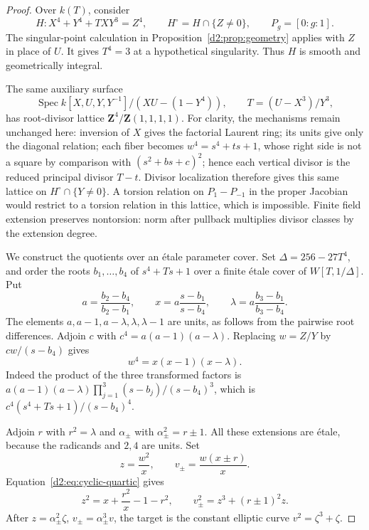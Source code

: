 \documentclass[11pt,a4paper]{amsart}
\numberwithin{equation}{section}
\theoremstyle{definition}
\theoremstyle{remark}
\newcommand{\DtwoZZ}{\mathbf{Z}}
\newcommand{\DtwoSpec}{\operatorname{Spec}}
\begin{document}
\begin{proof}
Over \(k(T)\), consider
\[
 H\colon X^4+Y^4+TXY^3=Z^4,\qquad
 H^\circ=H\cap\{Z\ne0\},\qquad
 P_g=[0:g:1].
\]
The singular-point calculation in
Proposition~\ref{d2:prop:geometry} applies with \(Z\) in place of \(U\).
It gives \(T^4=3\) at a hypothetical singularity.
Thus \(H\) is smooth and geometrically integral.

The same auxiliary surface
\[
 \DtwoSpec k[X,U,Y,Y^{-1}]/(XU-(1-Y^4)),
 \qquad T=(U-X^3)/Y^3,
\]
has root-divisor lattice \(\DtwoZZ^4/\DtwoZZ(1,1,1,1)\).
For clarity, the mechanisms remain unchanged here: inversion of \(X\)
gives the factorial Laurent ring; its units give only the diagonal
relation; each fiber becomes
\(w^4=s^4+ts+1\), whose right side is not a square by comparison
with \((s^2+bs+c)^2\); hence each vertical divisor is the reduced
principal divisor \(T-t\).
Divisor localization therefore gives this same lattice on
\(H^\circ\cap\{Y\ne0\}\).
A torsion relation on \(P_1-P_{-1}\) in the proper Jacobian would
restrict to a torsion relation in this lattice, which is impossible.
Finite field extension preserves nontorsion: norm after pullback multiplies divisor classes by the extension degree.

We construct the quotients over an \'etale parameter cover.
Set \(\Delta=256-27T^4\), and order the roots
\(b_1,\ldots,b_4\) of \(s^4+Ts+1\) over a finite \'etale cover of
\(W[T,1/\Delta]\).
Put
\[
 a=\frac{b_2-b_4}{b_2-b_1},\qquad
 x=a\frac{s-b_1}{s-b_4},\qquad
 \lambda=a\frac{b_3-b_1}{b_3-b_4}.
\]
The elements \(a,a-1,a-\lambda,\lambda,\lambda-1\) are units,
as follows from the pairwise root differences.
Adjoin \(c\) with \(c^4=a(a-1)(a-\lambda)\).
Replacing \(w=Z/Y\) by \(cw/(s-b_4)\) gives
\begin{equation}\label{d2:eq:cyclic-quartic}
 w^4=x(x-1)(x-\lambda).
\end{equation}
Indeed the product of the three transformed factors is
\(a(a-1)(a-\lambda)\prod_{j=1}^3(s-b_j)/(s-b_4)^3\),
which is \(c^4(s^4+Ts+1)/(s-b_4)^4\).

Adjoin \(r\) with \(r^2=\lambda\) and
\(\alpha_\pm\) with \(\alpha_\pm^2=r\pm1\).
All these extensions are \'etale, because the radicands and \(2,4\)
are units.
Set
\[
 z=\frac{w^2}{x},\qquad v_\pm=\frac{w(x\pm r)}x.
\]
Equation~\eqref{d2:eq:cyclic-quartic} gives
\begin{equation}\label{d2:eq:elliptic-quotients}
 z^2=x+\frac{r^2}{x}-1-r^2,\qquad
 v_\pm^2=z^3+(r\pm1)^2z.
\end{equation}
After \(z=\alpha_\pm^2\zeta\), \(v_\pm=\alpha_\pm^3v\),
the target is the constant elliptic curve \(v^2=\zeta^3+\zeta\).


\end{proof}
\end{document}
